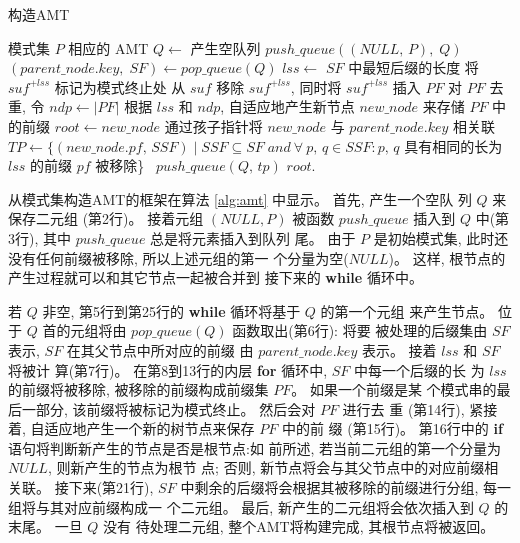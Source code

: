 \begin{algorithm}
  \caption{构造AMT}
  \label{alg:amt}
  \begin{algorithmic}[1]
    \REQUIRE 模式集 $P$
    \ENSURE  相应的 AMT
    \STATE
    \STATE $Q \leftarrow$ 产生空队列
    \STATE $push\_queue((NULL,\,P),\; Q)$
    \STATE
    \STATE $(parent\_node.key,\; SF) \leftarrow pop\_queue(Q)$
    \STATE $lss \leftarrow$ $SF$ 中最短后缀的长度
    \STATE 将 $suf^{+lss}$ 标记为模式终止处
    \ENDIF
    \STATE   从 $suf$ 移除 $suf^{+lss}$, 同时将 $suf^{+lss}$ 插入 $PF$
    \ENDFOR
    \STATE 对 $PF$ 去重, 令 $ndp \leftarrow |PF|$
    \STATE 根据 $lss$ 和 $ndp$, 自适应地产生新节点
    $new\_node$ 来存储 $PF$ 中的前缀
    \STATE $root \leftarrow new\_node$
    \ELSE
    \STATE 通过孩子指针将 $new\_node$
    与 $parent\_node.key$ 相关联
    \ENDIF
    \STATE $TP \leftarrow \{(new\_node.pf,\, SSF) \mid SSF \subseteq SF\; and
    \ \forall \ p,\,q \in SSF: p,\,q$ 具有相同的长为 $lss$ 的前缀
    $pf$ 被移除\}\
    \STATE $push\_queue(Q,\,tp)$
    \ENDFOR
    \ENDWHILE
    \STATE
    \RETURN $root$.
  \end{algorithmic}
\end{algorithm}

从模式集构造AMT的框架在算法 \ref{alg:amt} 中显示。 首先, 产生一个空队
列 $Q$ 来保存二元组 (第2行)。 接着元组 $(NULL, P)$ 被函数 $push\_queue$
插入到 $Q$ 中(第3行), 其中 $push\_queue$ 总是将元素插入到队列
尾。 由于 $P$ 是初始模式集, 此时还没有任何前缀被移除, 所以上述元组的第一
个分量为空($NULL$)。 这样, 根节点的产生过程就可以和其它节点一起被合并到
接下来的 \textbf{while} 循环中。

若 $Q$ 非空, 第5行到第25行的 \textbf{while} 循环将基于 $Q$ 的第一个元组
来产生节点。 位于 $Q$ 首的元组将由 $pop\_queue(Q)$ 函数取出(第6行): 将要
被处理的后缀集由 $SF$ 表示, $SF$ 在其父节点中所对应的前缀
由 $parent\_node.key$ 表示。 接着 $lss$ 和 $SF$ 将被计
算(第7行)。 在第8到13行的内层 \textbf{for} 循环中, $SF$ 中每一个后缀的长
为 $lss$ 的前缀将被移除, 被移除的前缀构成前缀集 $PF$。 如果一个前缀是某
个模式串的最后一部分, 该前缀将被标记为模式终止。 然后会对 $PF$ 进行去
重 (第14行), 紧接着, 自适应地产生一个新的树节点来保存 $PF$ 中的前
缀 (第15行)。 第16行中的 \textbf{if} 语句将判断新产生的节点是否是根节点:如
前所述, 若当前二元组的第一个分量为 $NULL$, 则新产生的节点为根节
点; 否则, 新节点将会与其父节点中的对应前缀相关联。 接下来(第21行), $SF$
中剩余的后缀将会根据其被移除的前缀进行分组, 每一组将与其对应前缀构成一
个二元组。 最后, 新产生的二元组将会依次插入到 $Q$ 的末尾。 一旦 $Q$ 没有
待处理二元组, 整个AMT将构建完成, 其根节点将被返回。

